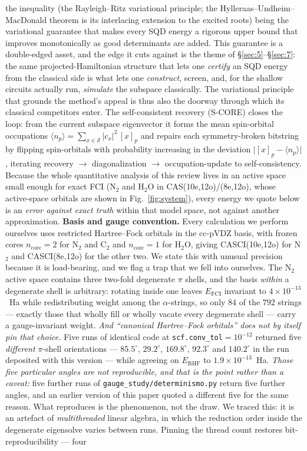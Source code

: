\documentclass[onecolumn,a4paper]{quantumarticle}
\begin{document}
the inequality (the Rayleigh--Ritz variational principle; the Hylleraas--Undheim--MacDonald theorem is its interlacing extension to the excited roots) being the variational guarantee that makes every SQD energy a rigorous upper bound that improves monotonically as good determinants are added. This guarantee is a double-edged asset, and the edge it cuts against is the theme of \S\ref{sec:5}--\S\ref{sec:7}: the same projected-Hamiltonian structure that lets one \emph{certify} an SQD energy from the classical side is what lets one \emph{construct}, screen, and, for the shallow circuits actually run, \emph{simulate} the subspace classically. The variational principle that grounds the method's appeal is thus also the doorway through which its classical competitors enter. The self-consistent recovery (S-CORE) closes the loop: from the current subspace eigenvector it forms the mean spin-orbital occupations $\langle n_p\rangle = \sum_{x\in\mathcal S} |c_x|^2\, [x]_p$ and repairs each symmetry-broken bitstring by flipping spin-orbitals with probability increasing in the deviation $\big|[x]_p-\langle n_p\rangle\big|$, iterating recovery $\to$ diagonalization $\to$ occupation-update to self-consistency. Because the whole quantitative analysis of this review lives in an active space small enough for exact FCI (N$_2$ and H$_2$O in CAS(10e,12o)/(8e,12o), whose active-space orbitals are shown in Fig.~\ref{fig:system}), every energy we quote below is an \emph{error against exact truth} within that model space, not against another approximation. \textbf{Basis and gauge convention.} Every calculation we perform ourselves uses restricted Hartree--Fock orbitals in the cc-pVDZ basis, with frozen cores $n_{\mathrm{core}}{=}2$ for N$_2$ and C$_2$ and $n_{\mathrm{core}}{=}1$ for H$_2$O, giving CASCI(10e,12o) for N$_2$ and CASCI(8e,12o) for the other two. We state this with unusual precision because it is load-bearing, and we flag a trap that we fell into ourselves. The N$_2$ active space contains three two-fold degenerate $\pi$ shells, and the basis \emph{within} a degenerate shell is arbitrary: rotating inside one leaves $E_{\mathrm{FCI}}$ invariant to $4\times10^{-13}$~Ha while redistributing weight among the $\alpha$-strings, so only $84$ of the $792$ strings --- exactly those that wholly fill or wholly vacate every degenerate shell --- carry a gauge-invariant weight. \emph{And ``canonical Hartree--Fock orbitals'' does not by itself pin that choice.} Five runs of identical code at \texttt{scf.conv\_tol}${=}10^{-12}$ returned five \emph{different} $\pi$-shell orientations --- $85.5^\circ$, $29.2^\circ$, $169.8^\circ$, $92.3^\circ$ and $140.2^\circ$ in the run deposited with this version --- while agreeing on $E_{\mathrm{RHF}}$ to $1.9\times10^{-13}$~Ha. \emph{Those five particular angles are not reproducible, and that is the point rather than a caveat:} five further runs of \texttt{gauge\_study/determinismo.py} return five further angles, and an earlier version of this paper quoted a different five for the same reason. What reproduces is the phenomenon, not the draw. We traced this: it is an artefact of \emph{multithreaded} linear algebra, in which the reduction order inside the degenerate eigensolve varies between runs. Pinning the thread count restores bit-reproducibility --- four 
\end{document}
